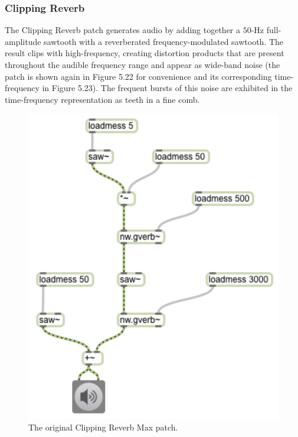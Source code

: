 \documentclass[12pt]{report} 	%
\numberwithin{figure}{chapter}
\numberwithin{table}{chapter}
\numberwithin{equation}{chapter}
\begin{document}
\begin{flushleft}
\clearpage
\subsubsection{Clipping Reverb}
The Clipping Reverb patch generates audio by adding together a $50$-Hz full-amplitude sawtooth with a reverberated frequency-modulated sawtooth. The result clips with high-frequency, creating distortion products that are present throughout the audible frequency range and appear as wide-band noise (the patch is shown again in Figure 5.22 for convenience and its corresponding time-frequency in Figure 5.23). The frequent bursts of this noise are exhibited in the time-frequency representation as teeth in a fine comb.
\begin{figure}[h!]
\begin{center}
\includegraphics[scale=0.8]{ClippingReverbSaw}
\caption[Original clipping reverb Max patch]{The original Clipping Reverb Max patch.}
\end{center}
\end{figure}
\\
\begin{figure}[h!]

\end{figure}
\end{flushleft}
\end{document}

